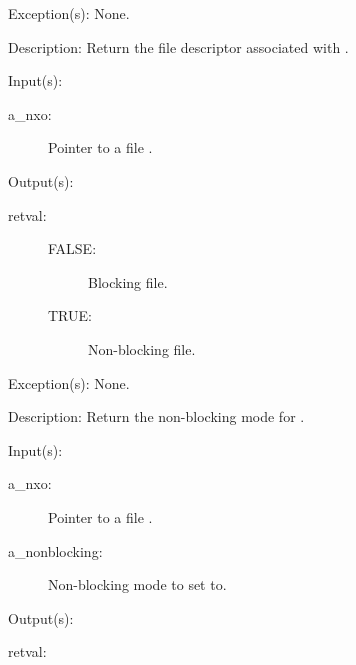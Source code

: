 \begin{capi}
\begin{capilist}
\begin{description}
		\end{description}
	\item[Exception(s): ] None.
	\item[Description: ]
		Return the file descriptor associated with .
	\end{capilist}
\label{nxo_file_nonblocking_get}
	\begin{capilist}
	\item[Input(s): ]
		\begin{description}\item[]
		\item[a\_nxo: ]
			Pointer to a file .
		\end{description}
	\item[Output(s): ]
		\begin{description}\item[]
		\item[retval: ]
			\begin{description}\item[]
			\item[FALSE: ]
				Blocking file.
			\item[TRUE: ]
				Non-blocking file.
			\end{description}
		\end{description}
	\item[Exception(s): ] None.
	\item[Description: ]
		Return the non-blocking mode for .
	\end{capilist}
\label{nxo_file_nonblocking_set}
	\begin{capilist}
	\item[Input(s): ]
		\begin{description}\item[]
		\item[a\_nxo: ]
			Pointer to a file \classname{nxo}.
		\item[a\_nonblocking: ]
			Non-blocking mode to set \classname{nxo} to.
		\end{description}
	\item[Output(s): ]
		\begin{description}\item[]
		\item[retval: ]

\end{description}
\end{capilist}
\end{capi}

